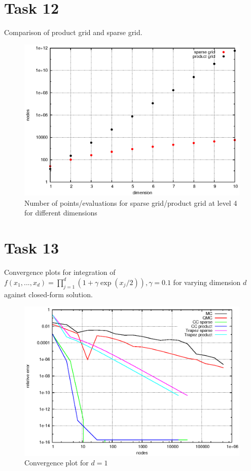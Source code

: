 \documentclass[]{article}
\begin{document}
\section*{Task 12}
Comparison of product grid and sparse grid.\\
\begin{figure}[!ht]
\centering
\includegraphics[width=.9\textwidth]{task12}
\caption{Number of points/evaluations for sparse grid/product grid at level 4 for different dimensions}
\label{fig:Task12}
\end{figure}
\clearpage

\section*{Task 13}
Convergence plots for integration of $f(x_1,...,x_d)=\prod_{j=1}^d (1+\gamma\exp(x_j/2)),\gamma=0.1$ for varying dimension $d$ against closed-form solution.\\
\begin{figure}[!ht]
\centering
\includegraphics[width=.9\textwidth]{task13_d1}
\caption{Convergence plot for $d=1$}
\label{fig:Task13a}
\end{figure}
\end{document}

